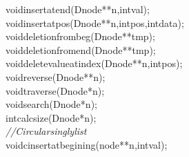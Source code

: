 \documentclass[a4paper, 9pt]{article}
\newcommand\SPC{\hspace*{0.6em}}
\newcommand{\CppAComment}[1]{\textit{\textcolor[rgb]{0.4,0.45,0.48}{#1}}}
\newcommand{\CppAIdentifier}[1]{\textcolor[rgb]{0.88,0.89,0.89}{#1}}
\newcommand{\CppAReservedWord}[1]{\textcolor[rgb]{0.4,0.55,0.69}{#1}}
\newcommand{\CppASpace}[1]{\colorbox[rgb]{0.16,0.19,0.2}{#1}}
\newcommand{\CppASymbol}[1]{\textcolor[rgb]{0.91,0.89,0.72}{#1}}
\begin{document}
\begin{ttfamily}
\CppAReservedWord{void}\CppASpace{\SPC }\CppAIdentifier{insertatend}\CppASymbol{(}\CppASpace{\SPC }\CppAIdentifier{Dnode}\CppASymbol{*}\CppASymbol{*}\CppASpace{\SPC }\CppAIdentifier{n}\CppASymbol{,}\CppAReservedWord{int}\CppASpace{\SPC }\CppAIdentifier{val}\CppASymbol{)}\CppASymbol{;}\\
\CppAReservedWord{void}\CppASpace{\SPC }\CppAIdentifier{insertatpos}\CppASymbol{(}\CppAIdentifier{Dnode}\CppASymbol{*}\CppASymbol{*}\CppASpace{\SPC }\CppAIdentifier{n}\CppASymbol{,}\CppAReservedWord{int}\CppASpace{\SPC }\CppAIdentifier{pos}\CppASymbol{,}\CppAReservedWord{int}\CppASpace{\SPC }\CppAIdentifier{data}\CppASymbol{)}\CppASymbol{;}\\
\CppAReservedWord{void}\CppASpace{\SPC }\CppAIdentifier{deletionfrombeg}\CppASymbol{(}\CppAIdentifier{Dnode}\CppASymbol{*}\CppASymbol{*}\CppASpace{\SPC }\CppAIdentifier{tmp}\CppASpace{\SPC }\CppASymbol{)}\CppASymbol{;}\\
\CppAReservedWord{void}\CppASpace{\SPC }\CppAIdentifier{deletionfromend}\CppASymbol{(}\CppAIdentifier{Dnode}\CppASymbol{*}\CppASymbol{*}\CppASpace{\SPC }\CppAIdentifier{tmp}\CppASpace{\SPC }\CppASymbol{)}\CppASymbol{;}\\
\CppAReservedWord{void}\CppASpace{\SPC }\CppAIdentifier{deletevalueatindex}\CppASymbol{(}\CppAIdentifier{Dnode}\CppASymbol{*}\CppASymbol{*}\CppASpace{\SPC }\CppAIdentifier{n}\CppASymbol{,}\CppAReservedWord{int}\CppASpace{\SPC }\CppAIdentifier{pos}\CppASymbol{)}\CppASymbol{;}\\
\CppAReservedWord{void}\CppASpace{\SPC }\CppAIdentifier{reverse}\CppASymbol{(}\CppAIdentifier{Dnode}\CppASymbol{*}\CppASymbol{*}\CppASpace{\SPC }\CppAIdentifier{n}\CppASymbol{)}\CppASymbol{;}\\
\CppAReservedWord{void}\CppASpace{\SPC }\CppAIdentifier{traverse}\CppASymbol{(}\CppAIdentifier{Dnode}\CppASymbol{*}\CppASpace{\SPC }\CppAIdentifier{n}\CppASymbol{)}\CppASymbol{;}\\
\CppAReservedWord{void}\CppASpace{\SPC }\CppAIdentifier{search}\CppASymbol{(}\CppAIdentifier{Dnode}\CppASymbol{*}\CppASpace{\SPC }\CppAIdentifier{n}\CppASymbol{)}\CppASymbol{;}\\
\CppAReservedWord{int}\CppASpace{\SPC }\CppAIdentifier{calcsize}\CppASymbol{(}\CppAIdentifier{Dnode}\CppASpace{\SPC }\CppASymbol{*}\CppAIdentifier{n}\CppASymbol{)}\CppASymbol{;}\\
\CppAComment{//Circularsinglylist}\\
\CppAReservedWord{void}\CppASpace{\SPC }\CppAIdentifier{cinsertatbegining}\CppASymbol{(}\CppASpace{\SPC }\CppAIdentifier{node}\CppASymbol{*}\CppASymbol{*}\CppASpace{\SPC }\CppAIdentifier{n}\CppASymbol{,}\CppAReservedWord{int}\CppASpace{\SPC }\CppAIdentifier{val}\CppASymbol{)}\CppASymbol{;}\\

\end{ttfamily}
\end{document}
